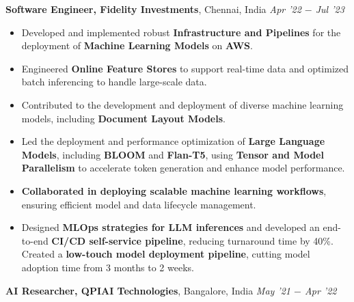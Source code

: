 \documentclass[10pt,a4]{article}
\begin{document}
{\begin{flushleft}
    \vspace{0.5mm}
    \hspace{1.5mm} \textbf{\large Software Engineer, Fidelity Investments},  Chennai, India \hfill \textit{\large Apr '22 $-$ Jul '23}	\\
    \begin{itemize}
        \item Developed and implemented robust \textbf{Infrastructure and Pipelines} for the deployment of \textbf{Machine Learning Models} on \textbf{AWS}.  
         \item Engineered \textbf{Online Feature Stores} to support real-time data and optimized batch inferencing to handle large-scale data.
         \item Contributed to the development and deployment of diverse machine learning models, including \textbf{Document Layout Models}.
         \item Led the deployment and performance optimization of \textbf{Large Language Models}, including \textbf{BLOOM} and \textbf{Flan-T5}, using \textbf{Tensor and Model Parallelism} to accelerate token generation and enhance model performance.
        \item \textbf{Collaborated in deploying scalable machine learning workflows}, ensuring efficient model and data lifecycle management.
        \item Designed \textbf{MLOps strategies for LLM inferences} and developed an end-to-end \textbf{CI/CD self-service pipeline}, reducing turnaround time by 40\%. Created a \textbf{low-touch model deployment pipeline}, cutting model adoption time from 3 months to 2 weeks.
    \end{itemize}	

    \vspace{0.5mm}
    \hspace{1.5mm} \textbf{\large AI Researcher, QPIAI Technologies},  Bangalore, India \hfill \textit{\large May '21 $-$ Apr '22}	\\
    \begin{itemize}
          

\end{itemize}
\end{flushleft}}
\end{document}
